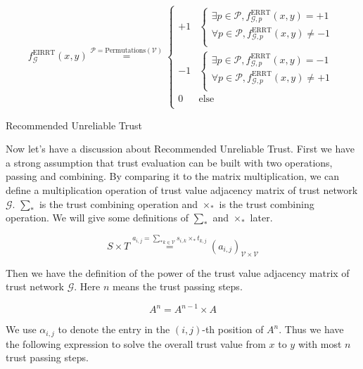 \documentclass{article}
\begin{document}
\begin{equation}
f_{\mathcal{G}}^{\text{EIRRT}}(x,y)\overset{\mathcal{P}=\text{Permutations}(\mathcal{V})}{=}\left\{
\begin{array}{cc}
 +1 & \left\{
\begin{array}{c}
 \exists \mathit{p}\in \mathcal{P},f_{\mathcal{G},\mathit{p}}^{\text{ERRT}}(x,y)=+1 \\
 \forall \mathit{p}\in \mathcal{P},f_{\mathcal{G},\mathit{p}}^{\text{ERRT}}(x,y)\neq -1 \\
\end{array}
\right. \\
 -1 & \left\{
\begin{array}{c}
 \exists \mathit{p}\in \mathcal{P},f_{\mathcal{G},\mathit{p}}^{\text{ERRT}}(x,y)=-1 \\
 \forall \mathit{p}\in \mathcal{P},f_{\mathcal{G},\mathit{p}}^{\text{ERRT}}(x,y)\neq +1 \\
\end{array}
\right. \\
 0 & \text{else} \\
\end{array}
\right.
\end{equation}

Recommended Unreliable Trust

Now let{'}s have a discussion about Recommended Unreliable Trust. First we have a strong assumption that trust evaluation can be built with two operations,
passing and combining. By comparing it to the matrix multiplication, we can define a multiplication operation of trust value adjacency matrix of
trust network \(\mathcal{G}\). \(\sum _*\) is the trust combining operation and \(\times _*\) is the trust combining operation. We will give some
definitions of \(\sum _*\) and \(\times _*\) later.

\begin{equation}
S\times T\overset{a_{i,j}=\underset{k\in \mathcal{V}}{\sum _*}s_{i,k}\times _*t_{k,j}}{=}\left(a_{i,j}\right)_{\mathcal{V}\times \mathcal{V}}
\end{equation}

Then we have the definition of the power of the trust value adjacency matrix of trust network \(\mathcal{G}\). Here \(n\) means the trust passing
steps.

\begin{equation}
A^n=A^{n-1}\times A
\end{equation}

We use \(\alpha _{i,j}\) to denote the entry in the \((i,j)\)-th position of \(A^n\). Thus we have the following expression to solve the overall
trust value from \(x\) to \(y\) with most \(n\) trust passing steps.
\end{document}
